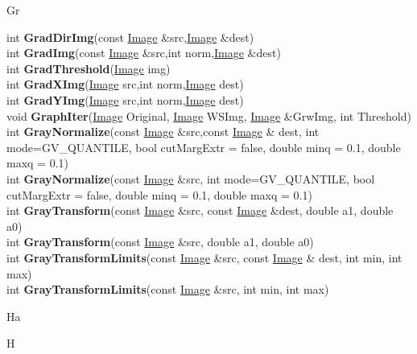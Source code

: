 \documentclass[10pt,titlepage]{article}
\def\functionlistentry#1#2#3#4#5#6{\noindent #1 {\bf #2}(#3) \dotfill #6\\}
\def\letterref#1{}
\def\letterlabel#1{\vspace{0.5cm}\centerline{\Large #1}}
\def\letterlabelend#1{}
\begin{document}
{{\letterlabel{Gr}
\letterref{A}
\letterref{B}
\letterref{C}
\letterref{D}
\letterref{E}
\letterref{F}
\letterref{G}
\letterref{H}
\letterref{I}
\letterref{K}
\letterref{L}
\letterref{M}
\letterref{N}
\letterref{O}
\letterref{P}
\letterref{Q}
\letterref{R}
\letterref{S}
\letterref{T}
\letterref{U}
\letterref{V}
\letterref{W}
\letterref{X}
\letterref{Y}
\letterref{Z}

\letterref{Ga}
\letterref{Ge}
\letterref{Gr}
\letterlabelend{Gr}
\functionlistentry{int}{GradDirImg}{const \hyperlink{Image}{Image} \&src,\hyperlink{Image}{Image} \&dest}{359}{filter}{}
\functionlistentry{int}{GradImg}{const \hyperlink{Image}{Image} \&src,int norm,\hyperlink{Image}{Image} \&dest}{358}{filter}{}
\functionlistentry{int}{GradThreshold}{\hyperlink{Image}{Image} img}{445}{conturs}{}
\functionlistentry{int}{GradXImg}{\hyperlink{Image}{Image} src,int norm,\hyperlink{Image}{Image} dest}{346}{filter}{}
\functionlistentry{int}{GradYImg}{\hyperlink{Image}{Image} src,int norm,\hyperlink{Image}{Image} dest}{347}{filter}{}
\functionlistentry{void}{GraphIter}{\hyperlink{Image}{Image} Original, \hyperlink{Image}{Image} WSImg, \hyperlink{Image}{Image} \&GrwImg, int Threshold}{1144}{segmentation}{}
\functionlistentry{int}{GrayNormalize}{const \hyperlink{Image}{Image} \&src,const \hyperlink{Image}{Image} \& dest, int mode=GV\_QUANTILE, bool cutMargExtr = false, double minq = 0.1, double maxq = 0.1}{1078}{processing}{}
\functionlistentry{int}{GrayNormalize}{const \hyperlink{Image}{Image} \&src, int mode=GV\_QUANTILE, bool cutMargExtr = false, double minq = 0.1, double maxq = 0.1}{1079}{processing}{}
\functionlistentry{int}{GrayTransform}{const \hyperlink{Image}{Image} \&src, const \hyperlink{Image}{Image} \&dest, double a1, double a0}{1074}{processing}{}
\functionlistentry{int}{GrayTransform}{const \hyperlink{Image}{Image} \&src, double a1, double a0}{1075}{processing}{}
\functionlistentry{int}{GrayTransformLimits}{const \hyperlink{Image}{Image} \&src, const \hyperlink{Image}{Image} \& dest, int min, int max}{1076}{processing}{}
\functionlistentry{int}{GrayTransformLimits}{const \hyperlink{Image}{Image} \&src, int min, int max}{1077}{processing}{}

\letterlabel{Ha}
\letterlabel{H}
\letterref{A}
\letterref{B}
\letterref{C}
\letterref{D}
\letterref{E}
\letterref{F}
\letterref{G}
\letterref{H}
\letterref{I}
\letterref{K}
\letterref{L}
\letterref{M}
\letterref{N}
\letterref{O}
\letterref{P}
\letterref{Q}
\letterref{R}
\letterref{S}
\letterref{T}
\letterref{U}
\letterref{V}
\letterref{W}
\letterref{X}
\letterref{Y}
\letterref{Z}

}}
\end{document}
